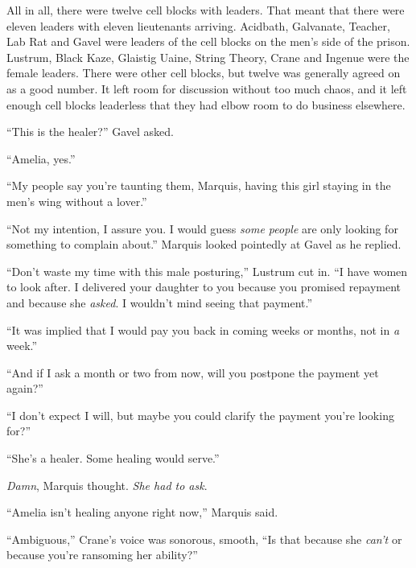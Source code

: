 All in all, there were twelve cell blocks with leaders.  That meant that there were eleven leaders with eleven lieutenants arriving.  Acidbath, Galvanate, Teacher, Lab Rat and Gavel were leaders of the cell blocks on the men's side of the prison.  Lustrum, Black Kaze, Glaistig Uaine, String Theory, Crane and Ingenue were the female leaders.  There were other cell blocks, but twelve was generally agreed on as a good number.  It left room for discussion without too much chaos, and it left enough cell blocks leaderless that they had elbow room to do business elsewhere.



``This is the healer?'' Gavel asked.



``Amelia, yes.''



``My people say you're taunting them, Marquis, having this girl staying in the men's wing without a lover.''



``Not my intention, I assure you.  I would guess \emph{some people} are only looking for something to complain about.''  Marquis looked pointedly at Gavel as he replied.



``Don't waste my time with this male posturing,'' Lustrum cut in.  ``I have women to look after.  I delivered your daughter to you because you promised repayment and because she \emph{asked}.  I wouldn't mind seeing that payment.''



``It was implied that I would pay you back in coming weeks or months, not in \emph{a} week.''



``And if I ask a month or two from now, will you postpone the payment yet again?''



``I don't expect I will, but maybe you could clarify the payment you're looking for?''



``She's a healer.  Some healing would serve.''



\emph{Damn}, Marquis thought.  \emph{She had to ask}.



``Amelia isn't healing anyone right now,'' Marquis said.



``Ambiguous,'' Crane's voice was sonorous, smooth, ``Is that because she \emph{can't} or because you're ransoming her ability?''



